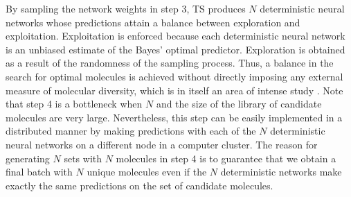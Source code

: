 By sampling the network weights in step 3, TS produces $N$ deterministic neural networks whose predictions attain a balance between exploration and exploitation. Exploitation is enforced because each deterministic neural network is an unbiased estimate of the Bayes' optimal predictor. Exploration is obtained as a result of the randomness of the sampling process. 
Thus, a balance in the search for optimal molecules is achieved without directly imposing any external measure of molecular diversity, which is in itself an area of intense study \cite{Maldonado_2006}. 
Note that step 4 is a bottleneck when $N$ and the size of the library of candidate molecules are very large.
Nevertheless, this step can be easily implemented in a distributed manner by making predictions with each of
the $N$ deterministic neural networks on a different node in a computer cluster. The reason for generating $N$ sets with $N$ molecules in step 4 is to guarantee that we obtain a final batch with $N$ unique molecules even if the $N$ deterministic networks make exactly the same predictions on the set of candidate molecules.